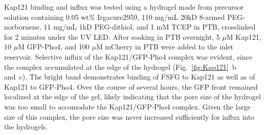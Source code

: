 
Kap121 binding and influx was tested using a hydrogel made from precursor solution containing 0.05 wt\% Irgacure2959, 110 mg/mL 20kD 8-armed PEG-norbornene, 11 mg/mL 1kD PEG-dithiol, and 1 mM TCEP in PTB, crosslinked for 2 minutes under the UV LED.  After soaking in PTB overnight, 5 $\mu$M Kap121, 10 $\mu$M GFP-Pho4, and 100 $\mu$M mCherry in PTB were added to the inlet reservoir.  Selective influx of the Kap121/GFP-Pho4 complex was evident, since the complex accumulated at the edge of the hydrogel (Fig.~\ref{fig:Kap121}~b and~c).  The bright band demonstrates binding of FSFG to Kap121 as well as of Kap121 to GFP-Pho4.  Over the course of several hours, the GFP front remained localized at the edge of the gel, likely indicating that the pore size of the hydrogel was too small to accomodate the Kap121/GFP-Pho4 complex.  Given the large size of this complex, the pore size was never increased sufficiently for influx into the hydrogels.


